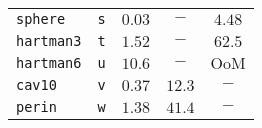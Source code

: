 \begin{tabular}{p{2.3cm}cccc}
\multirow{1}{*}{\texttt{sphere}} & \texttt{s} &
$\mathbf{0.03}$ & $-$ & $4.48$\\
\multirow{1}{*}{\texttt{hartman3}} & \texttt{t} &
$\mathbf{1.52}$ & $-$ & $62.5$ \\
\multirow{1}{*}{\texttt{hartman6}} & \texttt{u} &
$\mathbf{10.6}$ & $-$ & $\text{OoM}$ \\
\multirow{1}{*}{\texttt{cav10}} & \texttt{v} &
$\mathbf{0.37}$ & $12.3$ & $-$ \\
\multirow{1}{*}{\texttt{perin}} & \texttt{w} &
$\mathbf{1.38}$ & $41.4$ & $-$ \\
\hline
\end{tabular}
